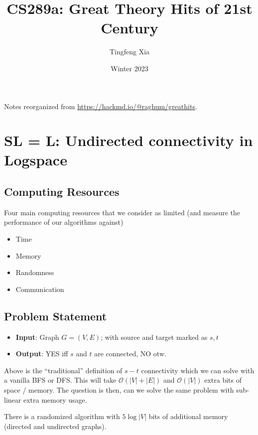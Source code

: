 \documentclass[11pt, letter]{book}
\author{Tingfeng Xia}
\title{CS289a: Great Theory Hits of 21st Century}
\date{Winter 2023}
\begin{document}
\maketitle

\vspace*{\fill}
Notes reorganized from \url{https://hackmd.io/@raghum/greathits}.\newline \newline 
\doclicenseThis

\tableofcontents

\chapter{SL = L: Undirected connectivity in Logspace}

\section{Computing Resources}
Four main computing resources that we consider as limited (and measure the performance of our algorithms against)
\begin{itemize}
	\item Time 
	\item Memory
	\item Randomness
	\item Communication
\end{itemize}

\section{Problem Statement}

\begin{itemize}
	\item \textbf{Input}: Graph $G = (V, E)$; with source and target marked as $s, t$
	\item \textbf{Output}: YES iff $s$ and $t$ are connected, NO otw.
\end{itemize}

Above is the ``traditional'' definition of $s-t$ connectivity which we can solve with a vanilla BFS or DFS. This will take $\mathcal O ( |V| + |E| ) $ and $\mathcal O (|V| )$ extra bits of space / memory. The question is then, can we solve the same problem with sub-linear extra memory usage. 

\begin{proposition}
	There is a randomized algorithm with $5 \log |V|$ bits of additional memory (directed and undirected graphs). 
\end{proposition}
\end{document}
